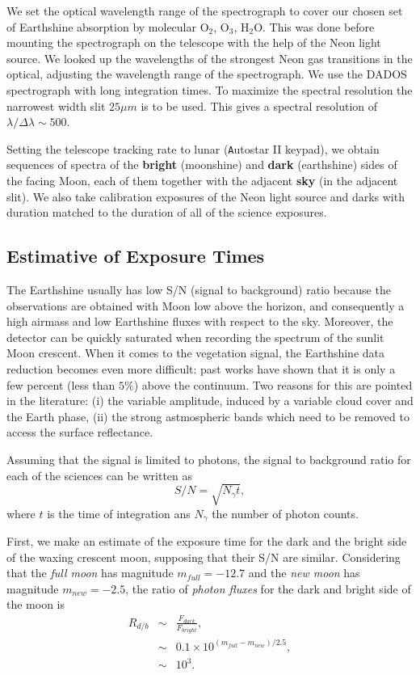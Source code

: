 We set the optical wavelength range of the spectrograph to cover our chosen set
of Earthshine absorption by molecular O$_2$, O$_3$, H$_2$O. This was done before
mounting the spectrograph on the telescope with the help of the Neon light
source. We looked up the  wavelengths of the strongest Neon gas transitions
in the optical, adjusting the wavelength range of the spectrograph. We use the
DADOS spectrograph with long integration times. To maximize the spectral
resolution the narrowest width slit $ 25 \mu m$ is to be used. This gives a
spectral resolution of $\lambda / \Delta \lambda \sim 500$.


Setting  the telescope tracking rate to lunar ({\texttt Autostar II}
keypad), we obtain sequences of spectra of the {\bf bright} (moonshine) and {\bf dark} (earthshine) sides
of the facing Moon, each of them together with  the adjacent {\bf sky} (in the
adjacent slit). We also take
calibration exposures of the Neon light source and  darks with duration matched
to the duration of all of the science exposures.

\subsection{Estimative of Exposure Times}

The Earthshine  usually has low S/N (signal to background) ratio because the
observations are obtained with Moon low above the horizon, and consequently a
high airmass and low Earthshine fluxes with respect to the sky. Moreover, the
detector can be quickly saturated when recording the spectrum of the sunlit Moon
crescent. When it comes to the vegetation signal, the Earthshine data reduction
becomes even more difficult: past works \cite{seager_etal05} have
shown that it  is only a few percent (less than $5\%$) above
the continuum. Two reasons for this are pointed in the literature: (i) the variable amplitude, induced by a variable cloud cover and the Earth phase, (ii) the strong astmospheric bands which need to be removed to access the surface reflectance. 

Assuming that the signal is limited to photons, the signal to background ratio
for each of the sciences can be written as
\begin{equation}
 S/N = \sqrt{N_{\gamma}t},
\end{equation}
where $t$ is the time of integration ans $N_{\gamma}$ the number of photon
counts.

First, we make an estimate of the exposure time for the dark and
the bright side of the waxing crescent moon, supposing that their S/N are
similar. Considering that the {\it full moon} has magnitude
$m_{full} = -12.7$ and the {\it new moon} has magnitude $m_{new}= -2.5$, the
ratio of {\it photon fluxes} for the dark and bright side of the moon \cite{CCD}
is
\begin{eqnarray}
 R_{d/b} &\sim&\frac{F_{dark}}{F_{bright}}, \nonumber \\ 
&\sim& 0.1 \times 10^{(m_{full} - m_{new}) / 2.5}, \nonumber \\
&\sim& 10^{3}. \nonumber 
\end{eqnarray}

